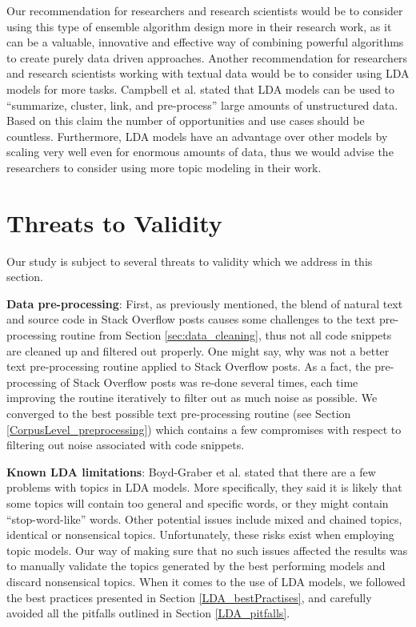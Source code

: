             Our recommendation for researchers and research scientists would be to consider using this type of ensemble algorithm design more in their research work, as it can be a valuable, innovative and effective way of combining powerful algorithms to create purely data driven approaches. Another recommendation for researchers and research scientists working with textual data would be to consider using LDA models for more tasks. Campbell et al. \cite{campbell2015latent} stated that LDA models can be used to ``summarize, cluster, link, and pre-process'' large amounts of unstructured data. Based on this claim the number of opportunities and use cases should be countless. Furthermore, LDA models have an advantage over other models by scaling very well even for enormous amounts of data, thus we would advise the researchers to consider using more topic modeling in their work.
        
    \section{Threats to Validity\label{sec:validity}}
    
        Our study is subject to several threats to validity which we address in this section.
        
        \textbf{Data pre-processing}:  First, as previously mentioned, the blend of natural text and source code in Stack Overflow posts causes some challenges to the text pre-processing routine from Section \ref{sec:data_cleaning}, thus not all code snippets are cleaned up and filtered out properly. One might say, why was not a better text pre-processing routine applied to Stack Overflow posts. As a fact, the pre-processing of Stack Overflow posts was re-done several times, each time improving the routine iteratively to filter out as much noise as possible. We converged to the best possible text pre-processing routine (see Section \ref{CorpusLevel_preprocessing}) which contains a few compromises with respect to filtering out noise associated with code snippets.
        
        \textbf{Known LDA limitations}: Boyd-Graber et al. \cite{boyd2014care} stated that there are a few problems with topics in LDA models. More specifically, they said it is likely that some topics will contain too general and specific words, or they might contain ``stop-word-like'' words. Other potential issues include mixed and chained topics, identical or nonsensical topics. Unfortunately, these risks exist when employing topic models. Our way of making sure that no such issues affected the results was to manually validate the topics generated by the best performing models and discard nonsensical topics. When it comes to the use of LDA models, we followed the best practices presented in Section \ref{LDA_bestPractises}, and carefully avoided all the pitfalls outlined in Section \ref{LDA_pitfalls}.
        
